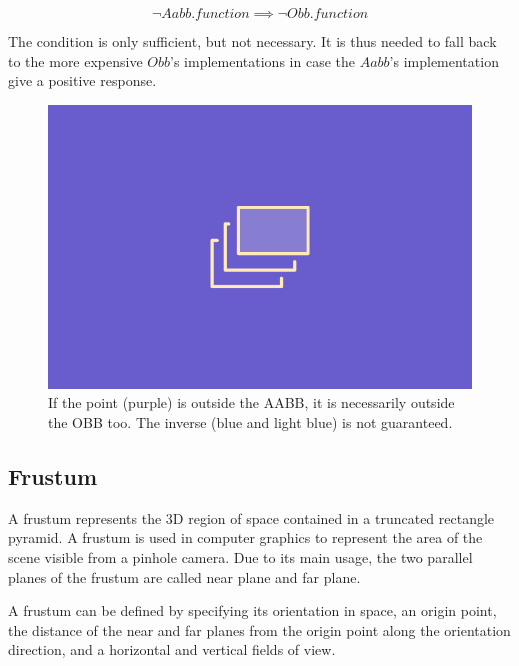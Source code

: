 \documentclass{PoliMi_MasterThesis}
\begin{document}
$$\neg Aabb.function \implies \neg Obb.function$$

The condition is only sufficient, but not necessary. It is thus needed to fall back to the more expensive $Obb$'s implementations in case the $Aabb$'s implementation give a positive response.
\begin{figure}[H]
    \centering
    \includegraphics[width=\textwidth*\real{0.6}]{Images/TODO.png}
    \caption{If the point (purple) is outside the AABB, it is necessarily outside the OBB too. The inverse (blue and light blue) is not guaranteed.}
    \label{fig:aabb_for_obb_contains}
\end{figure}


\subsection{Frustum} \label{ssec:frustum}
A frustum represents the 3D region of space contained in a truncated rectangle pyramid. A frustum is used in computer graphics to represent the area of the scene visible from a pinhole camera. Due to its main usage, the two parallel planes of the frustum are called near plane and far plane.

A frustum can be defined by specifying its orientation in space, an origin point, the distance of the near and far planes from the origin point along the orientation direction, and a horizontal and vertical fields of view.
\end{document}
